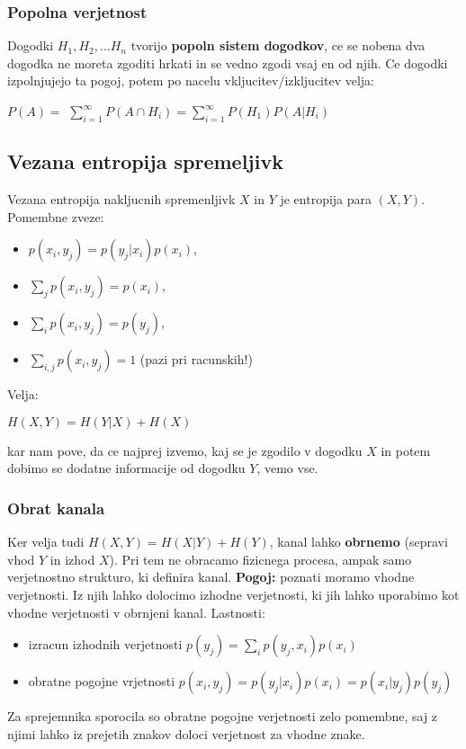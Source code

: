 \documentclass{article}
\begin{document}
\begin{multicols}{2}
	\subsubsection{Popolna verjetnost}
	Dogodki $H_{1}, H_{2}, \dots H_{n}$ tvorijo \textbf{popoln sistem dogodkov},
	ce se nobena dva dogodka ne moreta zgoditi hrkati in se vedno
	zgodi vsaj en od njih. Ce dogodki izpolnjujejo ta pogoj, potem po
	nacelu vkljucitev/izkljucitev velja:
	\begin{center}
		\begin{math}
			P(A) =
		\end{math}
		\smallskip
		\begin{math}
			\sum_{i=1}^{\infty} P(A \cap H_{i}) =
			\sum_{i=1}^{\infty} P(H_{1}) P(A | H_{i})
		\end{math}
	\end{center}

	\subsection{Vezana entropija spremeljivk}
	Vezana entropija nakljucnih spremenljivk $X$ in $Y$ je entropija para $(X, Y)$.
	Pomembne zveze:
	\begin{itemize}
		\item $p(x_i, y_j) = p(y_j| x_i)p(x_i)$,
		\item $\sum_j p(x_i, y_j) = p(x_i)$,
		\item $\sum_i p(x_i, y_j) = p(y_j)$,
		\item $\sum_{i,j} p(x_i, y_j) = 1$ (pazi pri racunskih!)
	\end{itemize}
	Velja:

	\begin{center}
		$H(X, Y) = H(Y|X) + H(X)$
	\end{center}
	kar nam pove, da ce najprej izvemo, kaj se je zgodilo v dogodku $X$ in potem
	dobimo se dodatne informacije od dogodku $Y$, vemo vse.
	\subsubsection{Obrat kanala}
	Ker velja tudi $H(X, Y) = H(X|Y) + H(Y)$, kanal lahko \textbf{obrnemo}
	(sepravi vhod $Y$ in izhod $X$). Pri tem ne obracamo fizicnega procesa, ampak samo verjetnostno strukturo, ki definira kanal. \textbf{Pogoj:}  poznati moramo vhodne verjetnosti. Iz njih lahko dolocimo izhodne verjetnosti, ki jih lahko
	uporabimo kot vhodne verjetnosti v obrnjeni kanal.
	Lastnosti:
	\begin{itemize}
		\item izracun izhodnih verjetnosti $p(y_j) = \sum_i p(y_j, x_i)p(x_i)$
		\item obratne pogojne vrjetnosti $p(x_i, y_j)= p(y_j|x_i)p(x_i) = p(x_i|y_j)p(y_j)$
	\end{itemize}
	Za sprejemnika sporocila so obratne pogojne verjetnosti zelo pomembne, saj z njimi lahko iz prejetih znakov doloci
	verjetnost za vhodne znake.


\end{multicols}
\end{document}
